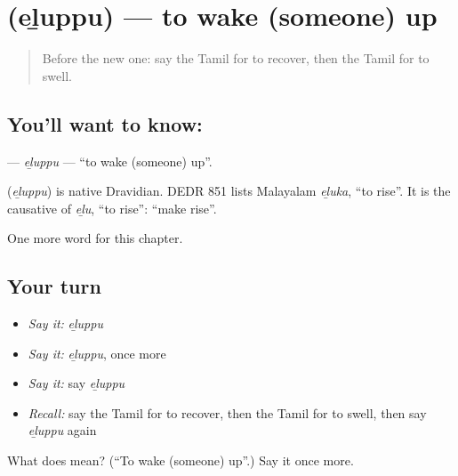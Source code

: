 \section[\texorpdfstring{\ta{எழுப்பு} (eḻuppu)}{எழுப்பு (eḻuppu)}]{ (eḻuppu) — to wake (someone) up}

\label{lesson:TA-C255-eluppu}



\begin{quote}
Before the new one: say the Tamil for to recover, then the Tamil for to swell.
\end{quote}

\subsection*{You'll want to know: }
\textbf{} — \emph{eḻuppu} — \textquotedblleft{}to wake (someone) up\textquotedblright{}.

\begin{cousinweb}
\textbf{} (\emph{eḻuppu}) is native Dravidian. DEDR 851 lists Malayalam \emph{eḻuka}, \textquotedblleft{}to rise\textquotedblright{}. It is the causative of \emph{eḻu}, \textquotedblleft{}to rise\textquotedblright{}: \textquotedblleft{}make rise\textquotedblright{}.
\end{cousinweb}

\begin{grammarlens}[title={What you've built}]
One more word for this chapter.
\end{grammarlens}

\subsection*{Your turn}
\begin{itemize}
\raggedright
  \item \emph{Say it:} \emph{eḻuppu}
  \item \emph{Say it:} \emph{eḻuppu}, once more
  \item \emph{Say it:} say \emph{eḻuppu}
  \item \emph{Recall:} say the Tamil for to recover, then the Tamil for to swell, then say \emph{eḻuppu} again
\end{itemize}

\begin{tcolorbox}[breakable,colback=teal!4,colframe=teal!35!black,title={Before you move on}]
What does  mean? (\textquotedblleft{}To wake (someone) up\textquotedblright{}.) Say it once more.
\end{tcolorbox}
